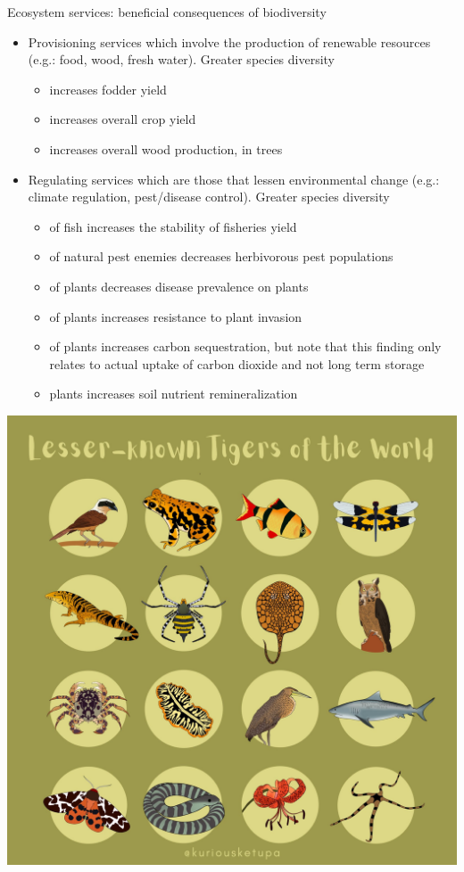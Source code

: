 \documentclass[
  ignorenonframetext,
  aspectratio=169]{beamer}
\providecommand{\tightlist}{%
  \setlength{\itemsep}{0pt}\setlength{\parskip}{0pt}}
\begin{document}
\begin{frame}{Ecosystem services: beneficial consequences of
biodiversity}
\protect\hypertarget{ecosystem-services-beneficial-consequences-of-biodiversity}{}
\begin{itemize}
\tightlist
\item
  Provisioning services which involve the production of renewable
  resources (e.g.: food, wood, fresh water). Greater species diversity

  \begin{itemize}
  \tightlist
  \item
    increases fodder yield
  \item
    increases overall crop yield
  \item
    increases overall wood production, in trees
  \end{itemize}
\item
  Regulating services which are those that lessen environmental change
  (e.g.: climate regulation, pest/disease control). Greater species
  diversity

  \begin{itemize}
  \tightlist
  \item
    of fish increases the stability of fisheries yield
  \item
    of natural pest enemies decreases herbivorous pest populations
  \item
    of plants decreases disease prevalence on plants
  \item
    of plants increases resistance to plant invasion
  \item
    of plants increases carbon sequestration, but note that this finding
    only relates to actual uptake of carbon dioxide and not long term
    storage
  \item
    plants increases soil nutrient remineralization
  \end{itemize}
\end{itemize}
\end{frame}

\begin{frame}{}
\protect\hypertarget{section-11}{}
\begin{center}\includegraphics[width=0.58\linewidth]{../images/lesser_known_tigers} \end{center}
\end{frame}
\end{document}
